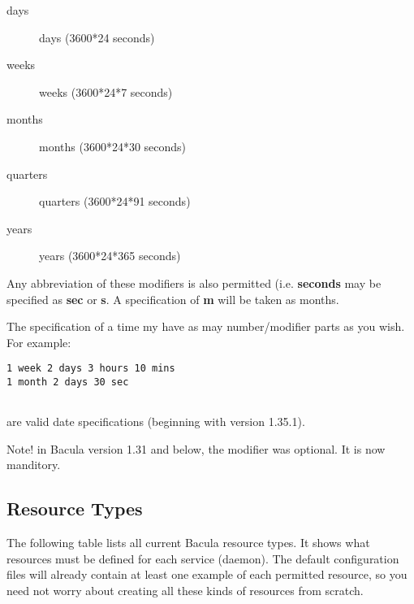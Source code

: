 \begin{description}
\begin{description}
\item [days]
   days (3600*24 seconds)  

\item [weeks]
   weeks (3600*24*7 seconds)  

\item [months]
   months (3600*24*30 seconds)  

\item [quarters]
   quarters (3600*24*91 seconds)  

\item [years]
   years (3600*24*365 seconds)  
\end{description}

Any abbreviation of these modifiers is also permitted (i.e.  {\bf seconds} may
be specified as {\bf sec} or {\bf s}.  A specification of {\bf m} will be
taken as months.  

The specification of a time my have as may number/modifier  parts as you wish.
For example:  

\footnotesize
\begin{verbatim}
1 week 2 days 3 hours 10 mins
1 month 2 days 30 sec
   
\end{verbatim}
\normalsize

are valid date specifications (beginning with version 1.35.1).  

Note! in Bacula version 1.31 and below, the modifier was optional.  It is now
manditory.  
\end{description}

\label{ResTypes}

\subsection*{Resource Types}

The following table lists all current Bacula resource types. It shows what
resources must be defined for each service (daemon). The default configuration
files will already contain at least one example of each permitted resource, so
you need not worry about creating all these kinds of resources from scratch. 

